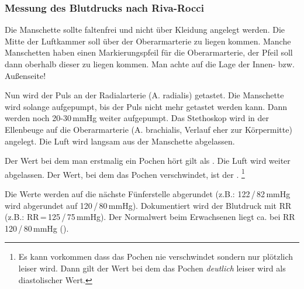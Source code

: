 \documentclass{beamer}
\begin{document}
\begin{frame}
\frametitle{Messung des Blutdrucks nach Riva-Rocci}
\scriptsize
Die Manschette sollte faltenfrei und nicht über Kleidung angelegt werden. Die
Mitte der Luftkammer soll über der Oberarmarterie zu liegen kommen. Manche
Manschetten haben einen Markierungspfeil für die Oberarmarterie, der Pfeil soll
dann oberhalb dieser zu liegen kommen. Man achte auf die Lage der Innen- bzw.
Außenseite!

Nun wird
der Puls an der Radialarterie (A. radialis) getastet. Die Manschette wird
solange aufgepumpt, bis der Puls nicht mehr getastet werden kann. Dann werden
noch 20-30\,mmHg weiter aufgepumpt. Das Stethoskop wird in der Ellenbeuge auf
die Oberarmarterie (A. brachialis, Verlauf eher zur Körpermitte) angelegt. Die
Luft wird langsam aus der Manschette abgelassen. 

Der Wert bei dem man
erstmalig ein Pochen  hört gilt als
. Die Luft wird weiter abgelassen. Der Wert, bei dem das
Pochen verschwindet, ist der . \footnote{Es kann
vorkommen dass das Pochen nie verschwindet sondern nur plötzlich leiser wird.
Dann gilt der Wert bei dem das Pochen \emph{deutlich} leiser wird als
diastolischer Wert.}

Die
Werte werden auf die nächste Fünferstelle abgerundet (z.B.:
122\,/\,82\,mmHg wird abgerundet auf 120\,/\,80\,mmHg). Dokumentiert
wird der Blutdruck mit RR (z.B.: RR\,=\,125\,/\,75\,mmHg). Der
Normalwert beim Erwachsenen liegt ca. bei RR 120\,/\,80\,mmHg
().

\end{frame}
\end{document}
